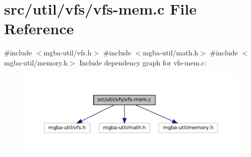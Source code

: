 \hypertarget{vfs-mem_8c}{}\section{src/util/vfs/vfs-\/mem.c File Reference}
\label{vfs-mem_8c}
{\ttfamily \#include $<$mgba-\/util/vfs.\+h$>$}\newline
{\ttfamily \#include $<$mgba-\/util/math.\+h$>$}\newline
{\ttfamily \#include $<$mgba-\/util/memory.\+h$>$}\newline
Include dependency graph for vfs-\/mem.c\+:
\nopagebreak
\begin{figure}[H]
\begin{center}
\leavevmode
\includegraphics[width=350pt]{vfs-mem_8c__incl}
\end{center}
\end{figure}
